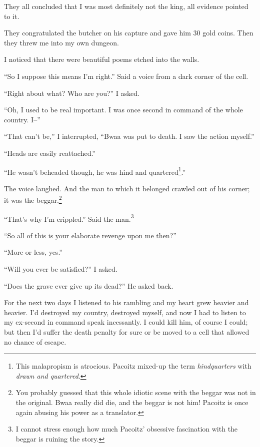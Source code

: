 They all concluded that I was most definitely not the king, all evidence pointed to it.

They congratulated the butcher on his capture and gave him 30 gold coins. Then they threw me into my own dungeon.

I noticed that there were beautiful poems etched into the walls. 

``So I suppose this means I'm right.'' Said a voice from a dark corner of the cell.

``Right about what? Who are you?'' I asked.

``Oh, I used to be real important. I was once second in command of the whole country. I--''

``That can't be,'' I interrupted, ``Bwaa was put to death. I saw the action myself.''

``Heads are easily reattached.''

``He wasn't beheaded though, he was hind and quartered\footnote{This malapropism is atrocious. Pa\-co\-itz mixed-up the term \emph{hindquarters} with \emph{drawn and quartered}.}.''

The voice laughed. And the man to which it belonged crawled out of his corner; it was the beggar.\footnote{You probably guessed that this whole idiotic scene with the beggar was not in the original. Bwaa really did die, and the beggar is not him! Pa\-co\-itz is once again abusing his power as a translator.}

``That's why I'm crippled.'' Said the man.\footnote{I cannot stress enough how much Pa\-co\-itz' obsessive fascination with the beggar is ruining the story.}

``So all of this is your elaborate revenge upon me then?''

``More or less, yes.''

``Will you ever be satisfied?'' I asked.

``Does the grave ever give up its dead?'' He asked back.

For the next two days I listened to his rambling and my heart grew heavier and heavier. I'd destroyed my country, destroyed myself, and now I had to listen to my ex-second in command speak incessantly. I could kill him, of course I could; but then I'd suffer the death penalty for sure or be moved to a cell that allowed no chance of escape.
